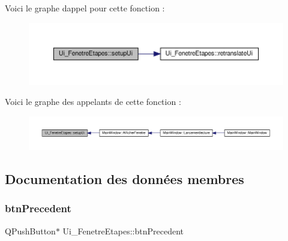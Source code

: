 Voici le graphe d\textquotesingle{}appel pour cette fonction \+:
\nopagebreak
\begin{figure}[H]
\begin{center}
\leavevmode
\includegraphics[width=350pt]{class_ui___fenetre_etapes_a5bf35503b72beb223e5a03ea046524a1_cgraph}
\end{center}
\end{figure}
Voici le graphe des appelants de cette fonction \+:
\nopagebreak
\begin{figure}[H]
\begin{center}
\leavevmode
\includegraphics[width=350pt]{class_ui___fenetre_etapes_a5bf35503b72beb223e5a03ea046524a1_icgraph}
\end{center}
\end{figure}


\subsection{Documentation des données membres}
\mbox{\label{class_ui___fenetre_etapes_afd2c805beef4f8e6df60ba666e2d9e3e}} 
\subsubsection{\texorpdfstring{btn\+Precedent}{btnPrecedent}}
{\footnotesize\ttfamily Q\+Push\+Button$\ast$ Ui\+\_\+\+Fenetre\+Etapes\+::btn\+Precedent}

\mbox{\label{class_ui___fenetre_etapes_ac4cd6163fd1066a242e7b2d7560317fa}} 
